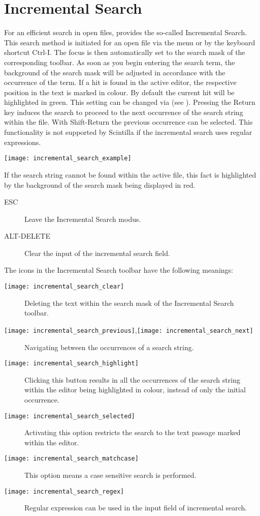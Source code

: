 \section{Incremental Search}

For an efficient search in open files, \codeblocks provides the so-called Incremental Search. This search method is initiated for an open file via the menu  or by the keyboard shortcut Ctrl-I. The focus is then automatically set to the search mask of the corresponding toolbar. As soon as you begin entering the search term, the background of the search mask will be adjusted in accordance with the occurrence of the term. If a hit is found in the active editor, the respective position in the text is marked in colour. By default the current hit will be highlighted in green. This setting can be changed via  (see ). Pressing the Return key induces the search to proceed to the next occurrence of the search string within the file. With Shift-Return the previous occurrence can be selected. This functionality is not supported by Scintilla if the incremental search uses regular expressions.

\texttt{[image: incremental\_search\_example]}

If the search string cannot be found within the active file, this fact is highlighted by the background of the search mask being displayed in red.


\begin{description}
\item[ESC] Leave the Incremental Search modus.
\item[ALT-DELETE] Clear the input of the incremental search field.
\end{description}

The icons in the Incremental Search toolbar have the following meanings:

\begin{description}
\item[\texttt{[image: incremental\_search\_clear]}] Deleting the text within the search mask of the Incremental Search toolbar.
\item[\texttt{[image: incremental\_search\_previous]},\texttt{[image: incremental\_search\_next]}] Navigating between the occurrences of a search string.
\item[\texttt{[image: incremental\_search\_highlight]}] Clicking this button results in all the occurrences of the search string within the editor being highlighted in colour, instead of only the initial occurrence.
\item[\texttt{[image: incremental\_search\_selected]}] Activating this option restricts the search to the text passage marked within the editor.
\item[\texttt{[image: incremental\_search\_matchcase]}] This option means a case sensitive search is performed.
\item[\texttt{[image: incremental\_search\_regex]}] Regular expression can be used in the input field of incremental search.
\end{description}


